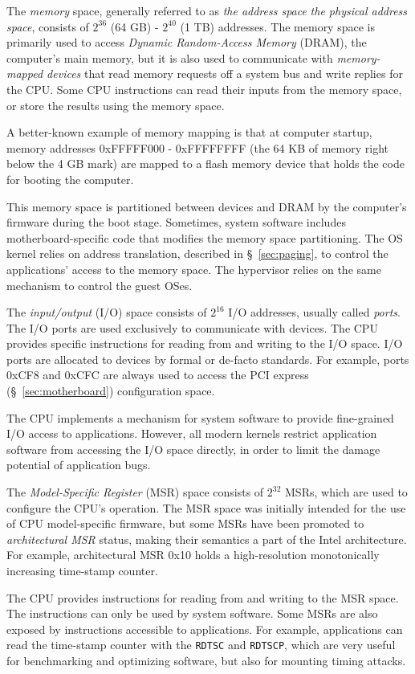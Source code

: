 The \textit{memory} space, generally referred to as \textit{the address space}
\textit{the physical address space}, consists of $2^{36}$ (64 GB) - $2^{40}$
(1 TB) addresses. The memory space is primarily used to access
\textit{Dynamic Random-Access Memory} (DRAM), the computer's main memory, but
it is also used to communicate with \textit{memory-mapped devices} that read
memory requests off a system bus and write replies for the CPU. Some CPU
instructions can read their inputs from the memory space, or store the results
using the memory space.

A better-known example of memory mapping is that at computer startup, memory
addresses 0xFFFFF000 - 0xFFFFFFFF (the 64 KB of memory right below the 4 GB
mark) are mapped to a flash memory device that holds the code for booting the
computer.

This memory space is partitioned between devices and DRAM by the computer's
firmware during the boot stage. Sometimes, system software includes
motherboard-specific code that modifies the memory space partitioning. The OS
kernel relies on address translation, described in \S~\ref{sec:paging}, to
control the applications' access to the memory space. The hypervisor relies on
the same mechanism to control the guest OSes.

The \textit{input/output} (I/O) space consists of $2^{16}$ I/O addresses,
usually called \textit{ports}. The I/O ports are used exclusively to
communicate with devices. The CPU provides specific instructions for reading
from and writing to the I/O space. I/O ports are allocated to devices by formal
or de-facto standards. For example, ports 0xCF8 and 0xCFC are always used to
access the PCI express (\S~\ref{sec:motherboard}) configuration space.

The CPU implements a mechanism for system software to provide fine-grained I/O
access to applications. However, all modern kernels restrict application
software from accessing the I/O space directly, in order to limit the damage
potential of application bugs.


The \textit{Model-Specific Register} (MSR) space consists of $2^{32}$ MSRs,
which are used to configure the CPU's operation. The MSR space was initially
intended for the use of CPU model-specific firmware, but some MSRs have been
promoted to \textit{architectural MSR} status, making their semantics a part of
the Intel architecture. For example, architectural MSR 0x10 holds a
high-resolution monotonically increasing time-stamp counter.

The CPU provides instructions for reading from and writing to the MSR space.
The instructions can only be used by system software. Some MSRs are also
exposed by instructions accessible to applications. For example, applications
can read the time-stamp counter with the \texttt{RDTSC} and \texttt{RDTSCP},
which are very useful for benchmarking and optimizing software, but also for
mounting timing attacks.
